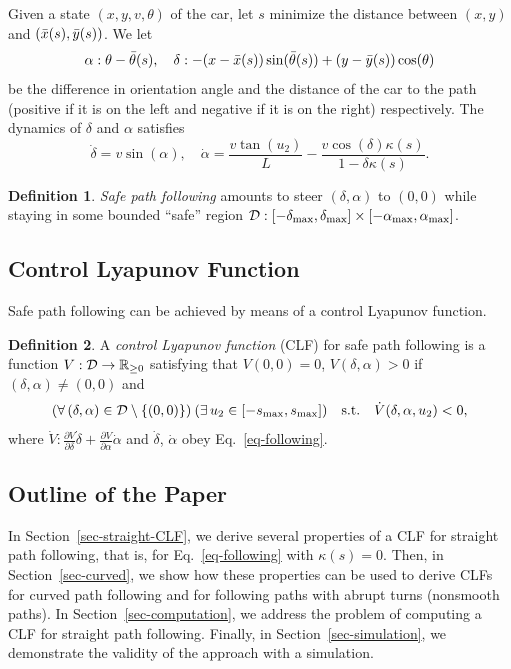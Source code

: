 \documentclass{article}
\theoremstyle{plain}
\theoremstyle{definition}
\newtheorem{definition}{Definition}
\theoremstyle{remark}
\newcommand{\smax}{s_\maxtxt}
\newcommand{\deltamax}{\delta_\maxtxt}
\newcommand{\alphamax}{\alpha_\maxtxt}
\begin{document}
Given a state $(x,y,v,\theta)$ of the car, let $s$
minimize the distance between $(x,y)$ and $(\bar{x}(s),\bar{y}(s))$.
We let
\[
\alpha:\theta-\bar{\theta}(s), \quad \delta:-(x-\bar{x}(s))\sin(\bar{\theta}(s))+(y-\bar{y}(s))\cos(\theta)
\]
be the difference in orientation angle and the distance
of the car to the path (positive if it is on the left and negative if it is on the right) respectively.
The dynamics of $\delta$ and $\alpha$ satisfies
\begin{equation}\label{eq-following}
\dot\delta = v\sin(\alpha), \quad \dot\alpha = \frac{v\tan(u_2)}L - \frac{v\cos(\delta)\kappa(s)}{1-\delta\kappa(s)}.
\end{equation}

\begin{definition}
\emph{Safe path following} amounts to steer $(\delta,\alpha)$ to $(0,0)$
while staying in some bounded ``safe'' region $\calD:[-\deltamax,\deltamax]\times[-\alphamax,\alphamax]$.
\end{definition}

\subsection{Control Lyapunov Function}

Safe path following can be achieved by means of a control Lyapunov function.

\begin{definition}
A \emph{control Lyapunov function} (CLF) for safe path following is a function $V:\mathcal{D}\to\mathbb{R}_{\geq0}$
satisfying that $V(0,0)=0$, $V(\delta,\alpha)>0$ if $(\delta,\alpha)\neq(0,0)$ and
\begin{equation}\label{eq-lie-clf}
(\forall\,(\delta,\alpha)\in\calD\setminus\{(0,0)\})\:(\exists\,u_2\in[-\smax,\smax])
\quad\text{s.t.}\quad \dot{V}(\delta,\alpha,u_2) < 0,
\end{equation}
where
$\dot{V}:\frac{\partial V}{\partial\delta}\dot\delta+\frac{\partial V}{\partial\alpha}\dot\alpha$
and $\dot\delta$, $\dot\alpha$ obey Eq.~\eqref{eq-following}.
\end{definition}

\subsection{Outline of the Paper}

In Section~\ref{sec-straight-CLF}, we derive several properties of a CLF for straight path following,
that is, for Eq.~\eqref{eq-following} with $\kappa(s)=0$.
Then, in Section~\ref{sec-curved}, we show how these properties can be used to derive
CLFs for curved path following and for following paths with abrupt turns (nonsmooth paths).
In Section~\ref{sec-computation}, we address the problem of computing a CLF for straight path following.
Finally, in Section~\ref{sec-simulation}, we demonstrate the validity of the approach with a simulation.
\end{document}

